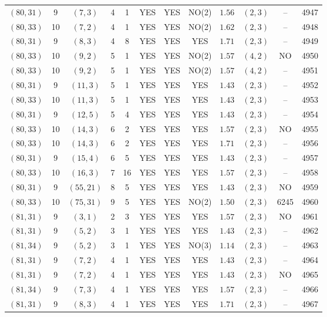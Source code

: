 \begin{longtable}{|c|c|c|c|c|c|c|c|c|c|c|c|}
$(80,31)$ & 9 & $(7,3)$ & 4 & 1 & YES & YES & NO(2) & $1.56$ & $(2,3)$ & -- & 4947\\
$(80,33)$ & 10 & $(7,2)$ & 4 & 1 & YES & YES & NO(2) & $1.62$ & $(2,3)$ & -- & 4948\\
$(80,31)$ & 9 & $(8,3)$ & 4 & 8 & YES & YES & YES & $1.71$ & $(2,3)$ & -- & 4949\\
$(80,33)$ & 10 & $(9,2)$ & 5 & 1 & YES & YES & NO(2) & $1.57$ & $(4,2)$ & NO & 4950\\
$(80,33)$ & 10 & $(9,2)$ & 5 & 1 & YES & YES & NO(2) & $1.57$ & $(4,2)$ & -- & 4951\\
$(80,31)$ & 9 & $(11,3)$ & 5 & 1 & YES & YES & YES & $1.43$ & $(2,3)$ & -- & 4952\\
$(80,33)$ & 10 & $(11,3)$ & 5 & 1 & YES & YES & YES & $1.43$ & $(2,3)$ & -- & 4953\\
$(80,31)$ & 9 & $(12,5)$ & 5 & 4 & YES & YES & YES & $1.43$ & $(2,3)$ & -- & 4954\\
$(80,33)$ & 10 & $(14,3)$ & 6 & 2 & YES & YES & YES & $1.57$ & $(2,3)$ & NO & 4955\\
$(80,33)$ & 10 & $(14,3)$ & 6 & 2 & YES & YES & YES & $1.71$ & $(2,3)$ & -- & 4956\\
$(80,31)$ & 9 & $(15,4)$ & 6 & 5 & YES & YES & YES & $1.43$ & $(2,3)$ & -- & 4957\\
$(80,33)$ & 10 & $(16,3)$ & 7 & 16 & YES & YES & YES & $1.57$ & $(2,3)$ & -- & 4958\\
$(80,31)$ & 9 & $(55,21)$ & 8 & 5 & YES & YES & YES & $1.43$ & $(2,3)$ & NO & 4959\\
$(80,33)$ & 10 & $(75,31)$ & 9 & 5 & YES & YES & NO(2) & $1.50$ & $(2,3)$ & 6245 & 4960\\
$(81,31)$ & 9 & $(3,1)$ & 2 & 3 & YES & YES & YES & $1.57$ & $(2,3)$ & NO & 4961\\
$(81,31)$ & 9 & $(5,2)$ & 3 & 1 & YES & YES & YES & $1.43$ & $(2,3)$ & -- & 4962\\
$(81,34)$ & 9 & $(5,2)$ & 3 & 1 & YES & YES & NO(3) & $1.14$ & $(2,3)$ & -- & 4963\\
$(81,31)$ & 9 & $(7,2)$ & 4 & 1 & YES & YES & YES & $1.43$ & $(2,3)$ & -- & 4964\\
$(81,31)$ & 9 & $(7,2)$ & 4 & 1 & YES & YES & YES & $1.43$ & $(2,3)$ & NO & 4965\\
$(81,34)$ & 9 & $(7,3)$ & 4 & 1 & YES & YES & YES & $1.57$ & $(2,3)$ & -- & 4966\\
$(81,31)$ & 9 & $(8,3)$ & 4 & 1 & YES & YES & YES & $1.71$ & $(2,3)$ & -- & 4967\\

\end{longtable}
